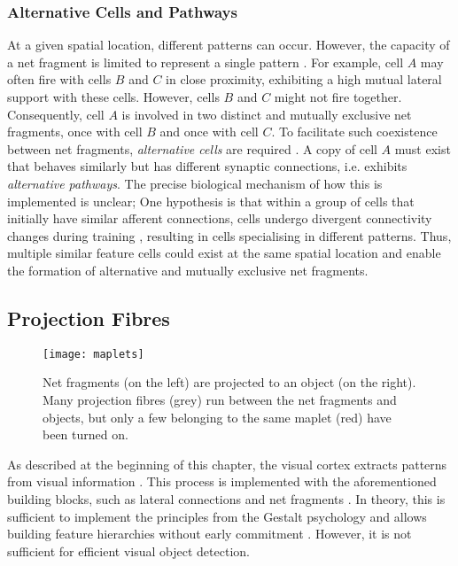 \subsubsection{Alternative Cells and Pathways}
At a given spatial location, different patterns can occur.
However, the capacity of a net fragment is limited to represent a single pattern .
For example, cell $A$ may often fire with cells $B$ and $C$ in close proximity, exhibiting a high mutual lateral support with these cells.
However, cells $B$ and $C$ might not fire together. Consequently, cell $A$ is involved in two distinct and mutually exclusive net fragments, once with cell $B$ and once with cell $C$.
To facilitate such coexistence between net fragments, \emph{alternative cells} are required . A copy of cell $A$ must exist that behaves similarly but has different synaptic connections, i.e. exhibits \emph{alternative pathways}.
The precise biological mechanism of how this is implemented is unclear; One hypothesis is that within a group of cells that initially have similar afferent connections, cells undergo divergent connectivity changes during training , resulting in cells specialising in different patterns. Thus, multiple similar feature cells could exist at the same spatial location and enable the formation of alternative and mutually exclusive net fragments.


\subsection{Projection Fibres}
\begin{figure}[h]
    \centering
    \texttt{[image: maplets]}
    \caption[An active maplet mapping net fragments to object prototypes]{Net fragments (on the left) are projected to an object (on the right). Many projection fibres (grey) run between the net fragments and objects, but only a few belonging to the same maplet (red) have been turned on.}
\end{figure}
%
As described at the beginning of this chapter, the visual cortex  extracts patterns from visual information . This process is implemented with the aforementioned building blocks, such as lateral connections  and net fragments \cite{von_der_malsburg_concerning_2018}. In theory, this is sufficient to implement the principles from the Gestalt psychology \cite{ellis_source_1938, kohler_gestalt_1992, wagemans_century_2012, hamlyn_psychology_2017} and allows building feature hierarchies without early commitment . However, it is not sufficient for efficient visual object detection.

